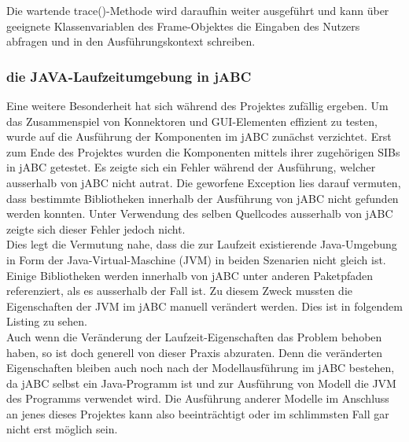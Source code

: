 Die wartende trace()-Methode wird daraufhin weiter ausgeführt und kann über geeignete Klassenvariablen des Frame-Objektes die Eingaben des Nutzers abfragen und in den Ausführungskontext schreiben.

\subsubsection{die JAVA-Laufzeitumgebung in jABC}	
Eine weitere Besonderheit hat sich während des Projektes zufällig ergeben. Um das Zusammenspiel von Konnektoren und GUI-Elementen effizient zu testen, wurde auf die Ausführung der Komponenten im jABC zunächst verzichtet. Erst zum Ende des Projektes wurden die Komponenten mittels ihrer zugehörigen SIBs in jABC getestet. Es zeigte sich ein Fehler während der Ausführung, welcher ausserhalb von jABC nicht autrat. Die geworfene Exception lies darauf vermuten, dass bestimmte Bibliotheken innerhalb der Ausführung von jABC nicht gefunden werden konnten. Unter Verwendung des selben Quellcodes ausserhalb von jABC zeigte sich dieser Fehler jedoch nicht.\\
Dies legt die Vermutung nahe, dass die zur Laufzeit existierende Java-Umgebung in Form der Java-Virtual-Maschine (JVM) in beiden Szenarien nicht gleich ist. Einige Bibliotheken werden innerhalb von jABC unter anderen Paketpfaden referenziert, als es ausserhalb der Fall ist. Zu diesem Zweck mussten die Eigenschaften der JVM im jABC manuell verändert werden. Dies ist in folgendem Listing zu sehen.\\
Auch wenn die Veränderung der Laufzeit-Eigenschaften das Problem behoben haben, so ist doch generell von dieser Praxis abzuraten. Denn die veränderten Eigenschaften bleiben auch noch nach der Modellausführung im jABC bestehen, da jABC selbst ein Java-Programm ist und zur Ausführung von Modell die JVM des Programms verwendet wird. Die Ausführung anderer Modelle im Anschluss an jenes dieses Projektes kann also beeinträchtigt oder im schlimmsten Fall gar nicht erst möglich sein.


